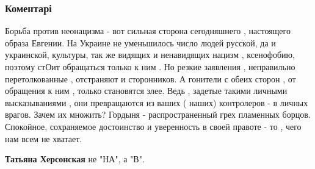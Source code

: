  
 
 
 
 
\subsubsection{Коментарі}
\label{sec:13_09_2021.fb.nikonov_sergej.1.bilchenko_ne_zabudete_ne_prostite.cmt}

\begin{itemize} %
 

Борьба против неонацизма - вот сильная сторона сегодняшнего , настоящего образа
Евгении. На Украине не уменьшилось число людей русской, да и украинской,
культуры, так же видящих и ненавидящих нацизм , ксенофобию, поэтому стОит
обращаться только к ним . Но резкие заявления , неправильно перетолкованные ,
отстраняют и сторонников. А гонители с обеих сторон , от обращения к ним ,
только становятся злее. Ведь , задетые такими личными высказываниями , они
превращаются из ваших ( наших) контролеров - в личных врагов. Зачем их множить?
Гордыня - распространенный грех пламенных борцов. Спокойное, сохраняемое
достоинство и уверенность в своей правоте - то , чего нам всем не хватает.

\begin{itemize} %
 
\textbf{Татьяна Херсонская} не "НА", а "В".

 

\end{itemize}
\end{itemize}
